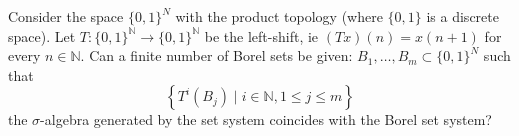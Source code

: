 Consider the space $ \{0,1 \} ^{N} $ with the product topology (where $\{0,1 \}$ is a discrete space). Let $ T: \{0,1 \} ^ {\mathbb {N}} \rightarrow \{0,1 \} ^ {\mathbb {N}} $ be the left-shift, ie $ (Tx) (n) = x (n+1) $ for every $ n \in \mathbb {N} $.
Can a finite number of Borel sets be given: $ B_ {1}, \ldots, B_ {m} \subset \{0,1 \} ^ {N} $ such that
$$
\left \{T ^ {i} \left (B_ {j} \right) \mid i \in \mathbb {N}, 1 \leq j \leq m \right \}
$$the $ \sigma $-algebra generated by the set system coincides with the Borel set system?